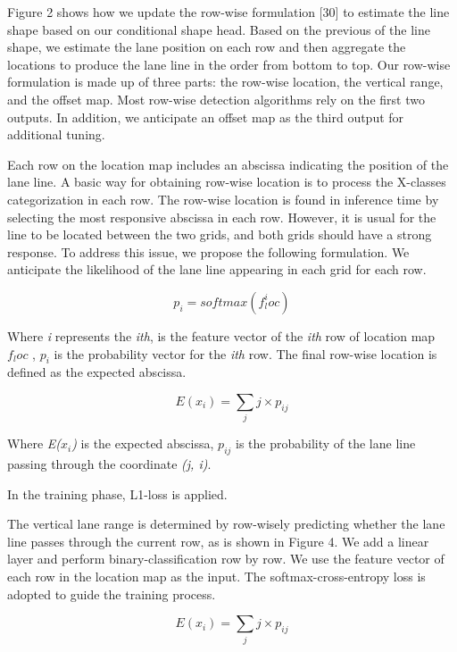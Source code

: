 Figure 2 shows how we update the row-wise formulation [30] to estimate the line shape based on our conditional shape head. Based on the previous of the line shape, we estimate the lane position on each row and then aggregate the locations to produce the lane line in the order from bottom to top. Our row-wise formulation is made up of three parts: the row-wise location, the vertical range, and the offset map. Most row-wise detection algorithms rely on the first two outputs. In addition, we anticipate an offset map as the third output for additional tuning.

Each row on the location map includes an abscissa indicating the position of the lane line.
A basic way for obtaining row-wise location is to process the X-classes categorization in each row. The row-wise location is found in inference time by selecting the most responsive abscissa in each row. However, it is usual for the line to be located between the two grids, and both grids should have a strong response. To address this issue, we propose the following formulation.
We anticipate the likelihood of the lane line appearing in each grid for each row.

\begin{equation}
p_i = softmax(f^i_loc)
\label{eqn:Softmax Function}
\end{equation}

Where \emph{i} represents the \emph{ith}, is the feature vector of the \emph{ith} row of location map $f_loc$ , \emph{$p_i$} is the probability vector for the \emph{ith} row. The final row-wise location is defined as the expected abscissa.

\begin{equation}
E(x _i) = \sum_{j} j \times p_{ij}
\label{eqn:Softmax Function}
\end{equation}

Where \emph{E($x_i$)} is the expected abscissa, \emph{$p_{ij}$} is the probability of the lane line passing through the coordinate \emph{(j, i)}.

In the training phase, L1-loss is applied.

The vertical lane range is determined by
row-wisely predicting whether the lane line passes through
the current row, as is shown in Figure 4. We add a linear
layer and perform binary-classification row by row. We use
the feature vector of each row in the location map as the
input. The softmax-cross-entropy loss is adopted to guide
the training process.

\begin{equation}
E(x _i) = \sum_{j} j \times p_{ij}
\label{eqn:Softmax Function}
\end{equation}


